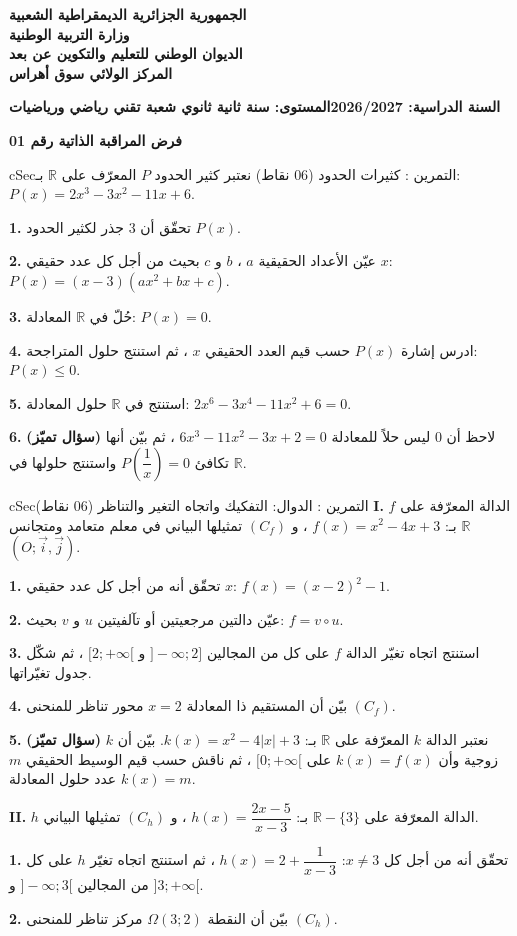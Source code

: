 \documentclass[12pt,a4paper]{article}
\newenvironment{BOX}[2]{\begin{otherlanguage}{english}\begin{arbox}{#1}{#2}}{\end{arbox}\end{otherlanguage}}
\newcounter{exo}
\newenvironment{tamrin}[1]{\stepcounter{exo}\begin{BOX}{cSec}{التمرين \theexo: #1}}{\end{BOX}}
\newenvironment{LTR}{\begin{otherlanguage}{english}}{\end{otherlanguage}}
\newcommand{\R}{\mathbb{R}}
\newcommand{\QQ}[1]{\par\smallskip\textbf{#1.} }
\begin{document}
\begin{center}
{\large\bfseries الجمهورية الجزائرية الديمقراطية الشعبية}\\[2pt]
{\bfseries وزارة التربية الوطنية}\\[2pt]
{\bfseries الديوان الوطني للتعليم والتكوين عن بعد}\\[2pt]
{\bfseries المركز الولائي سوق أهراس}
\end{center}
\noindent\textbf{السنة الدراسية: 2026/2027}\hfill\textbf{المستوى: سنة ثانية ثانوي شعبة تقني رياضي ورياضيات}
\par\smallskip
\begin{LTR}
\begin{tcolorbox}[enhanced,colback=cSec,colframe=cSec,arc=2mm,halign=center,boxrule=0pt,top=6pt,bottom=6pt,before upper={\selectlanguage{arabic}}]
{\color{white}\Large\bfseries فرض المراقبة الذاتية رقم 01}
\end{tcolorbox}
\end{LTR}

\begin{tamrin}{كثيرات الحدود (06 نقاط)}
نعتبر كثير الحدود $P$ المعرّف على $\R$ بـ: $P(x)=2x^3-3x^2-11x+6$.
\QQ{1} تحقّق أن $3$ جذر لكثير الحدود $P(x)$.
\QQ{2} عيّن الأعداد الحقيقية $a$ ، $b$ و $c$ بحيث من أجل كل عدد حقيقي $x$: $P(x)=(x-3)\left(ax^2+bx+c\right)$.
\QQ{3} حُلّ في $\R$ المعادلة: $P(x)=0$.
\QQ{4} ادرس إشارة $P(x)$ حسب قيم العدد الحقيقي $x$ ، ثم استنتج حلول المتراجحة: $P(x)\leqslant0$.
\QQ{5} استنتج في $\R$ حلول المعادلة: $2x^6-3x^4-11x^2+6=0$.
\QQ{6} \textbf{(سؤال تميّز)} لاحظ أن $0$ ليس حلاً للمعادلة $6x^3-11x^2-3x+2=0$ ، ثم بيّن أنها تكافئ $P\left(\dfrac1x\right)=0$ واستنتج حلولها في $\R$.
\end{tamrin}

\begin{tamrin}{الدوال: التفكيك واتجاه التغير والتناظر (06 نقاط)}
\textbf{I.} $f$ الدالة المعرّفة على $\R$ بـ: $f(x)=x^2-4x+3$ ، و $(C_f)$ تمثيلها البياني في معلم متعامد ومتجانس $\left(O;\vec i,\vec j\right)$.
\QQ{1} تحقّق أنه من أجل كل عدد حقيقي $x$: $f(x)=(x-2)^2-1$.
\QQ{2} عيّن دالتين مرجعيتين أو تآلفيتين $u$ و $v$ بحيث: $f=v\circ u$.
\QQ{3} استنتج اتجاه تغيّر الدالة $f$ على كل من المجالين $]-\infty;2]$ و $[2;+\infty[$ ، ثم شكّل جدول تغيّراتها.
\QQ{4} بيّن أن المستقيم ذا المعادلة $x=2$ محور تناظر للمنحنى $(C_f)$.
\QQ{5} \textbf{(سؤال تميّز)} نعتبر الدالة $k$ المعرّفة على $\R$ بـ: $k(x)=x^2-4|x|+3$. بيّن أن $k$ زوجية وأن $k(x)=f(x)$ على $[0;+\infty[$ ، ثم ناقش حسب قيم الوسيط الحقيقي $m$ عدد حلول المعادلة $k(x)=m$.
\par\medskip
\textbf{II.} $h$ الدالة المعرّفة على $\R-\{3\}$ بـ: $h(x)=\dfrac{2x-5}{x-3}$ ، و $(C_h)$ تمثيلها البياني.
\QQ{1} تحقّق أنه من أجل كل $x\neq3$: $h(x)=2+\dfrac1{x-3}$ ، ثم استنتج اتجاه تغيّر $h$ على كل من المجالين $]-\infty;3[$ و $]3;+\infty[$.
\QQ{2} بيّن أن النقطة $\Omega(3;2)$ مركز تناظر للمنحنى $(C_h)$.
\end{tamrin}
\end{document}
